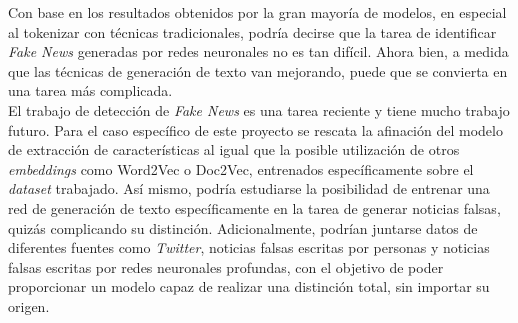 Con base en los resultados obtenidos por la gran mayoría de modelos, en especial al tokenizar con técnicas tradicionales, podría decirse que la tarea de identificar \textit{Fake News} generadas por redes neuronales no es tan difícil. Ahora bien, a medida que las técnicas de generación de texto van mejorando, puede que se convierta en una tarea más complicada.\\

El trabajo de detección de \textit{Fake News} es una tarea reciente y tiene mucho trabajo futuro. Para el caso específico de este proyecto se rescata la afinación del modelo de extracción de características al igual que la posible utilización de otros \textit{embeddings} como Word2Vec o Doc2Vec, entrenados específicamente sobre el \textit{dataset} trabajado. Así mismo, podría estudiarse la posibilidad de entrenar una red de generación de texto específicamente en la tarea de generar noticias falsas, quizás complicando su distinción. Adicionalmente, podrían juntarse datos de diferentes fuentes como \textit{Twitter}, noticias falsas escritas por personas y noticias falsas escritas por redes neuronales profundas, con el objetivo de poder proporcionar un modelo capaz de realizar una distinción total, sin importar su origen.
